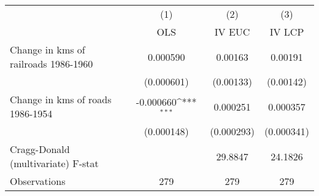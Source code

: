{
\def\sym#1{\ifmmode^{#1}\else\(^{#1}\)\fi}
\begin{tabular}{l*{3}{c}}
\hline\hline
                &\multicolumn{1}{c}{(1)}&\multicolumn{1}{c}{(2)}&\multicolumn{1}{c}{(3)}\\
                &\multicolumn{1}{c}{OLS}&\multicolumn{1}{c}{IV EUC}&\multicolumn{1}{c}{IV LCP}\\
\hline
Change in kms of railroads 1986-1960& 0.000590         &  0.00163         &  0.00191         \\
                &(0.000601)         &(0.00133)         &(0.00142)         \\
[1em]
Change in kms of roads 1986-1954&-0.000660\sym{***}& 0.000251         & 0.000357         \\
                &(0.000148)         &(0.000293)         &(0.000341)         \\
\hline
Cragg-Donald (multivariate) F-stat&                  &  29.8847         &  24.1826         \\
Observations    &      279         &      279         &      279         \\
\hline\hline
\end{tabular}
}
